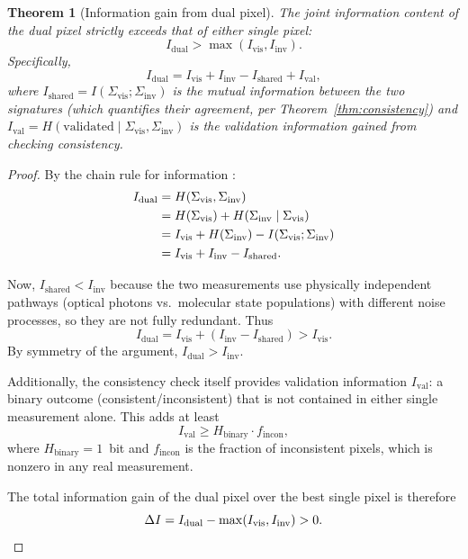 \documentclass[11pt,twocolumn,a4paper]{article}
\newtheorem{theorem}{Theorem}
\newcommand{\Sigvis}{\Sigma_{\mathrm{vis}}}
\newcommand{\Siginv}{\Sigma_{\mathrm{inv}}}
\begin{document}
\begin{theorem}[Information gain from dual pixel]\label{thm:info_gain}
The joint information content of the dual pixel strictly exceeds that of either single pixel:
\begin{equation}\label{eq:info_gain}
I_{\mathrm{dual}} > \max(I_{\mathrm{vis}}, I_{\mathrm{inv}}).
\end{equation}
Specifically,
\begin{equation}\label{eq:info_gain_quant}
I_{\mathrm{dual}} = I_{\mathrm{vis}} + I_{\mathrm{inv}} - I_{\mathrm{shared}} + I_{\mathrm{val}},
\end{equation}
where $I_{\mathrm{shared}} = I(\Sigvis; \Siginv)$ is the mutual information between the two signatures (which quantifies their agreement, per Theorem~\ref{thm:consistency}) and $I_{\mathrm{val}} = H(\text{validated} \mid \Sigvis, \Siginv)$ is the validation information gained from checking consistency.
\end{theorem}
\begin{proof}
By the chain rule for information \citep{CoverThomas2006}:
\begin{align}
I_{\mathrm{dual}} &= H(\Sigvis, \Siginv) \notag \\
&= H(\Sigvis) + H(\Siginv \mid \Sigvis) \notag \\
&= I_{\mathrm{vis}} + H(\Siginv) - I(\Sigvis; \Siginv) \notag \\
&= I_{\mathrm{vis}} + I_{\mathrm{inv}} - I_{\mathrm{shared}}.
\end{align}

Now, $I_{\mathrm{shared}} < I_{\mathrm{inv}}$ because the two measurements use physically independent pathways (optical photons vs.\ molecular state populations) with different noise processes, so they are not fully redundant.
Thus
\begin{equation}
I_{\mathrm{dual}} = I_{\mathrm{vis}} + (I_{\mathrm{inv}} - I_{\mathrm{shared}}) > I_{\mathrm{vis}}.
\end{equation}
By symmetry of the argument, $I_{\mathrm{dual}} > I_{\mathrm{inv}}$.

Additionally, the consistency check itself provides validation information $I_{\mathrm{val}}$: a binary outcome (consistent/inconsistent) that is not contained in either single measurement alone.
This adds at least
\begin{equation}
I_{\mathrm{val}} \geq H_{\mathrm{binary}} \cdot f_{\mathrm{incon}},
\end{equation}
where $H_{\mathrm{binary}} = 1$~bit and $f_{\mathrm{incon}}$ is the fraction of inconsistent pixels, which is nonzero in any real measurement.

The total information gain of the dual pixel over the best single pixel is therefore
\begin{equation}
\Delta I = I_{\mathrm{dual}} - \max(I_{\mathrm{vis}}, I_{\mathrm{inv}}) > 0. \qedhere
\end{equation}
\end{proof}
\end{document}
